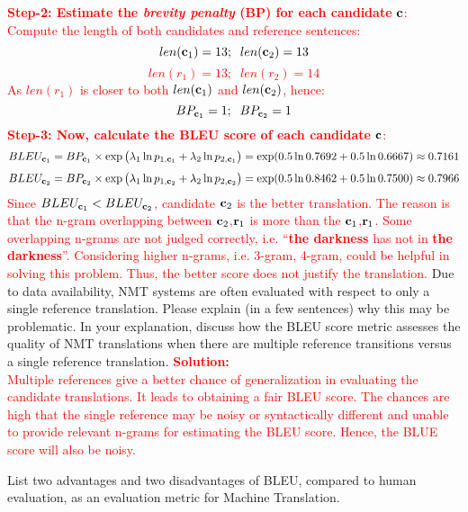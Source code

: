 \begin{parts}
\begin{subparts}
\textcolor{red}{\textbf{Step-2: Estimate the \textit{brevity penalty} (BP) for each candidate} $\mathbf{c}$:\\
Compute the length of both candidates and reference sentences:
\[len(\mathbf{c}_1) = 13; \;\; len(\mathbf{c}_2) = 13\]
\[len(r_1) = 13; \;\; len(r_2) = 14\]
As $len(r_1)$ is closer to both $len(\mathbf{c}_1)$ and $len(\mathbf{c}_2)$, hence:
\[BP_{\mathbf{c}_1}=1; \;\; BP_{\mathbf{c}_2}=1\]}
\textcolor{red}{\textbf{Step-3: Now, calculate the BLEU score of each candidate} $\mathbf{c}$:\\
\[ BLEU_{\mathbf{c}_1} = BP_{\mathbf{c}_1} \times \exp \big( \lambda_1 \ln p_{1,\mathbf{c}_1} + \lambda_2 \ln p_{2,\mathbf{c}_1} \big) = \exp (0.5 \ln 0.7692 + 0.5 \ln 0.6667) \approx 0.7161 \]
\[ BLEU_{\mathbf{c}_2} = BP_{\mathbf{c}_2} \times \exp \big( \lambda_1 \ln p_{1,\mathbf{c}_2} + \lambda_2 \ln p_{2,\mathbf{c}_2} \big)  = \exp (0.5 \ln 0.8462 + 0.5 \ln 0.7500) \approx 0.7966 \]
Since $BLEU_{\mathbf{c}_1} < BLEU_{\mathbf{c}_2}$, candidate $\mathbf{c}_2$ is the better translation. The reason is that the n-gram overlapping between $\mathbf{c}_2$,$\mathbf{r}_1$ is more than the $\mathbf{c}_1$,$\mathbf{r}_1$. Some overlapping n-grams are not judged correctly, i.e. ``\textbf{the darkness} has not in \textbf{the darkness}''. Considering higher n-grams, i.e. 3-gram, 4-gram, could be helpful in solving this problem. Thus, the better score does not justify the translation.
}
\vspace{0.5cm}        
        \subpart[2] Due to data availability, NMT systems are often evaluated with respect to only a single reference translation. Please explain (in a few sentences) why this may be problematic. In your explanation, discuss how the BLEU score metric assesses the quality of NMT translations when there are multiple reference transitions versus a single reference translation.
\vspace{0.5cm}
\textcolor{red}{\textbf{Solution: }\\
Multiple references give a better chance of generalization in evaluating the candidate translations. It leads to obtaining a fair BLEU score. The chances are high that the single reference may be noisy or syntactically different and unable to provide relevant n-grams for estimating the BLEU score. Hence, the BLUE score will also be noisy.}

\newpage
        
        \subpart[2] List two advantages and two disadvantages of BLEU, compared to human evaluation, as an evaluation metric for Machine Translation.


\end{subparts}
\end{parts}
